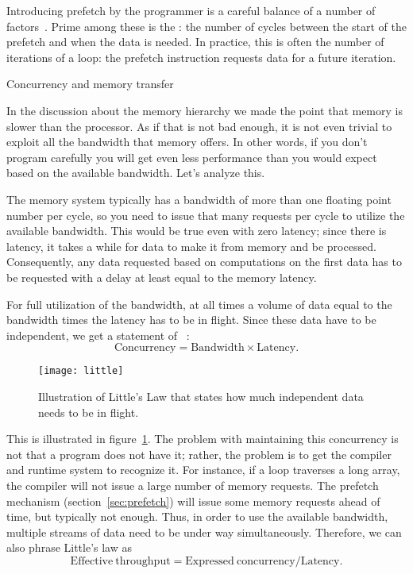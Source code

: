Introducing prefetch by the programmer is a careful balance of a
number of factors~\cite{Guttman:prefetchKNC}. Prime among these is the
: the number of cycles between the
start of the prefetch and when the data is needed. In practice, this
is often the number of iterations of a loop: the prefetch instruction
requests data for a future iteration.


 {Concurrency and memory transfer}

In the discussion about the memory hierarchy we made the point that
memory is slower than the processor. As if that is not bad enough, it
is not even trivial to exploit all the bandwidth that memory
offers. In other words, if you don't program carefully you will get
even less performance than you would expect based on the available
bandwidth. Let's analyze this.

The memory system typically has a bandwidth of more than one floating
point number per cycle, so you need to issue that many requests per
cycle to utilize the available bandwidth. This would be true even with
zero latency; since there is latency, it takes a while for data to
make it from memory and be processed. Consequently, any data requested
based on computations on the first data has to be requested with a
delay at least equal to the memory latency.

For full utilization of the bandwidth,
at all times a volume of data equal to the bandwidth times
the latency has to be in flight. Since these data have to be
independent, we get a statement of ~\cite{Little:law}:
\[ \mathrm{Concurrency}=\mathrm{Bandwidth}\times \mathrm{Latency}. \]
\begin{figure}[ht]
  \texttt{[image: little]}
  \caption{Illustration of Little's Law that states how much
    independent data needs to be in flight.}
  \label{fig:little}
\end{figure}
This is illustrated in figure~\ref{fig:little}. The problem with
maintaining this concurrency is not that a program does not have it;
rather, the problem is to get the compiler and runtime system
to recognize it.
For instance, if a loop traverses a long array, the
compiler will not issue a large number of memory requests. The
prefetch mechanism (section~\ref{sec:prefetch}) will issue some memory
requests ahead of time, but typically not enough. Thus, in order to
use the available bandwidth, multiple streams of data need to be under
way simultaneously. Therefore, we can also phrase Little's law as
\[ \mathrm{Effective\ throughput}=\mathrm{Expressed\ concurrency} / \mathrm{Latency}. \]

